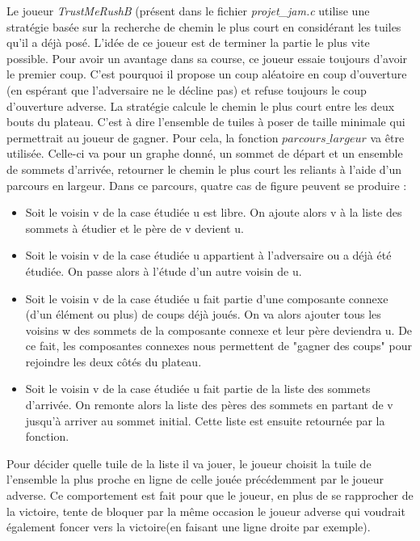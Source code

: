 \documentclass{article}
\begin{document}
Le joueur \textit{TrustMeRushB} (présent dans le fichier \textit{projet\_jam.c} utilise une stratégie basée sur la recherche de chemin le plus court en considérant les tuiles qu'il a déjà posé. L'idée de ce joueur est de terminer la partie le plus vite possible. Pour avoir un avantage dans sa course, ce joueur essaie toujours d'avoir le premier coup. C'est pourquoi il propose un coup aléatoire en coup d'ouverture (en espérant que l'adversaire ne le décline pas) et refuse toujours le coup d'ouverture adverse.
La stratégie calcule le chemin le plus court entre les deux bouts du plateau. C'est à dire l'ensemble de tuiles à poser de taille minimale qui permettrait au joueur de gagner. Pour cela, la fonction $parcours\_largeur$ va être utilisée. Celle-ci va pour un graphe donné, un sommet de départ et un ensemble de sommets d'arrivée, retourner le chemin le plus court les reliants à l'aide d'un parcours en largeur. Dans ce parcours, quatre cas de figure peuvent se produire :

\begin{itemize}
    \item Soit le voisin v de la case étudiée u est libre. On ajoute alors v à la liste des sommets à étudier et le père de v devient u.
    \item Soit le voisin v de la case étudiée u appartient à l'adversaire ou a déjà été étudiée. On passe alors à l'étude d'un autre voisin de u.
    \item Soit le voisin v de la case étudiée u fait partie d'une composante connexe (d'un élément ou plus) de coups déjà joués. On va alors ajouter tous les voisins w des sommets de la composante connexe et leur père deviendra u. De ce fait, les composantes connexes nous permettent de "gagner des coups" pour rejoindre les deux côtés du plateau.
    \item Soit le voisin v de la case étudiée u fait partie de la liste des sommets d'arrivée. On remonte alors la liste des pères des sommets en partant de v jusqu'à arriver au sommet initial. Cette liste est ensuite retournée par la fonction.
\end{itemize}


Pour décider quelle tuile de la liste il va jouer, le joueur choisit la tuile de l'ensemble la plus proche en ligne de celle jouée précédemment par le joueur adverse. Ce comportement est fait pour que le joueur, en plus de se rapprocher de la victoire, tente de bloquer par la même occasion le joueur adverse qui voudrait également foncer vers la victoire(en faisant une ligne droite par exemple).
\end{document}
